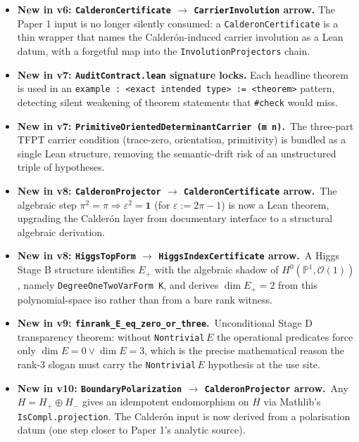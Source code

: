 \begin{itemize}[leftmargin=1.6em, itemsep=2pt]
    structural predicates and non-triviality.
\item \textbf{New in v6: \texttt{CalderonCertificate} $\to$
    \texttt{CarrierInvolution} arrow.} The Paper 1 input is no
    longer silently consumed: a \texttt{CalderonCertificate} is
    a thin wrapper that names the Calder\'on-induced carrier
    involution as a Lean datum, with a forgetful map into the
    \texttt{InvolutionProjectors} chain.
\item \textbf{New in v7: \texttt{AuditContract.lean} signature
    locks.} Each headline theorem is used in an
    \texttt{example : <exact intended type> := <theorem>}
    pattern, detecting silent weakening of theorem statements
    that \texttt{\#check} would miss.
\item \textbf{New in v7:
    \texttt{PrimitiveOrientedDeterminantCarrier (m n)}.}\ The
    three-part TFPT carrier condition (trace-zero, orientation,
    primitivity) is bundled as a single Lean structure, removing
    the semantic-drift risk of an unstructured triple of
    hypotheses.
\item \textbf{New in v8: \texttt{CalderonProjector} $\to$
    \texttt{CalderonCertificate} arrow.}\ The algebraic step
    $\pi^2 = \pi \Rightarrow \varepsilon^2 = \mathbf 1$ (for
    $\varepsilon := 2\pi - 1$) is now a Lean theorem, upgrading
    the Calder\'on layer from documentary interface to a
    structural algebraic derivation.
\item \textbf{New in v8: \texttt{HiggsTopForm} $\to$
    \texttt{HiggsIndexCertificate} arrow.}\ A Higgs Stage B
    structure identifies $E_+$ with the algebraic shadow of
    $H^0(\mathbb P^1, \mathcal O(1))$, namely
    \texttt{DegreeOneTwoVarForm K}, and derives $\dim E_+ = 2$
    from this polynomial-space iso rather than from a bare
    rank witness.
\item \textbf{New in v9: \texttt{finrank\_E\_eq\_zero\_or\_three}.}\
    Unconditional Stage D transparency theorem: without
    \texttt{Nontrivial}\,$E$ the operational predicates force
    only $\dim E = 0 \lor \dim E = 3$, which is the precise
    mathematical reason the rank-3 slogan must carry the
    \texttt{Nontrivial}\,$E$ hypothesis at the use site.
\item \textbf{New in v10: \texttt{BoundaryPolarization} $\to$
    \texttt{CalderonProjector} arrow.}\ Any $H = H_+ \oplus H_-$
    gives an idempotent endomorphism on $H$ via Mathlib's
    \texttt{IsCompl.projection}. The Calder\'on input is now
    derived from a polarisation datum (one step closer to
    Paper 1's analytic source).

\end{itemize}
